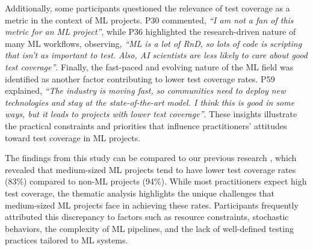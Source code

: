 Additionally, some participants questioned the relevance of test coverage as a metric in the context of ML projects. P30 commented, \textit{``I am not a fan of this metric for an ML project''}, while P36 highlighted the research-driven nature of many ML workflows, observing, \textit{``ML is a lot of RnD, so lots of code is scripting that isn’t as important to test. Also, AI scientists are less likely to care about good test coverage''}.
Finally, the fast-paced and evolving nature of the ML field was identified as another factor contributing to lower test coverage rates. P59 explained, \textit{``The industry is moving fast, so communities need to deploy new technologies and stay at the state-of-the-art model. I think this is good in some ways, but it leads to projects with lower test coverage''}. These insights illustrate the practical constraints and priorities that influence practitioners' attitudes toward test coverage in ML projects.

The findings from this study can be compared to our previous research \citep{bernardo2024machine}, which revealed that medium-sized ML projects tend to have lower test coverage rates (83\%) compared to non-ML projects (94\%). While most practitioners expect high test coverage, the thematic analysis highlights the unique challenges that medium-sized ML projects face in achieving these rates. Participants frequently attributed this discrepancy to factors such as resource constraints, stochastic behaviors, the complexity of ML pipelines, and the lack of well-defined testing practices tailored to ML systems.


